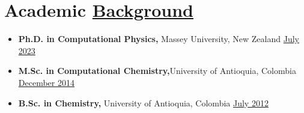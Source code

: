 \section{Academic \href{.}{Background}}

\begin{itemize}
    \itemsep-6mm
    \item {\bf Ph.D. in Computational Physics,} Massey University, New Zealand\hfill
          \href{.}{July 2023}\\
    \item {\bf M.Sc. in Computational Chemistry,}University of Antioquia, Colombia\hfill
          \href{.}{December 2014}\\
    \item {\bf B.Sc. in Chemistry,} University of Antioquia, Colombia\hfill
          \href{.}{July 2012}\\
\end{itemize}